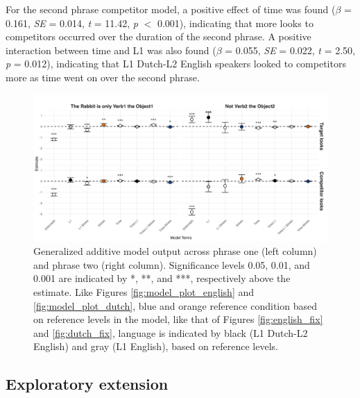 For the second phrase competitor model, a positive effect of time was found ($\beta$ = 0.161, \textit{SE} = 0.014, \textit{t} = 11.42, \textit{p} $<$ 0.001), indicating that more looks to competitors occurred over the duration of the second phrase. A positive interaction between time and L1 was also found ($\beta$ = 0.055, \textit{SE} = 0.022, \textit{t} = 2.50, \textit{p} = 0.012), indicating that L1 Dutch-L2 English speakers looked to competitors more as time went on over the second phrase. 

\begin{figure}[H]  %
    \centering
    \includegraphics[width=\textwidth,height=\textheight,keepaspectratio]{viz/gam_mod_out.png}
    \caption{Generalized additive model output across phrase one (left column) and phrase two (right column). Significance levels 0.05, 0.01, and 0.001 are indicated by *, **, and ***, respectively above the estimate. Like Figures \ref{fig:model_plot_english} and \ref{fig:model_plot_dutch}, blue and orange reference condition based on reference levels in the model, like that of Figures \ref{fig:english_fix} and \ref{fig:dutch_fix}, language is indicated by black (L1 Dutch-L2 English) and gray (L1 English), based on reference levels.}
    \label{fig:gam_mod_out}
\end{figure}

\subsection{Exploratory extension}

